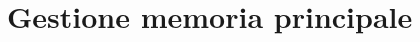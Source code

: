 \documentclass[a4paper]{article}
\begin{document}

\section{Gestione memoria principale}
\newpage
\end{document}
